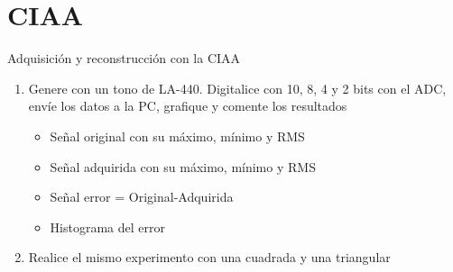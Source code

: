  \section{CIAA}
 \begin{frame}{Adquisición y reconstrucción con la CIAA}
    \begin{enumerate}
       \item{Genere con un tono de LA-440. Digitalice con 10, 8, 4 y 2 bits con el ADC, envíe los datos a la PC, grafique y comente los resultados}
          \begin{itemize}
             \item{Señal original con su máximo, mínimo y RMS }
             \item{Señal adquirida con su máximo, mínimo y RMS }
             \item{Señal error = Original-Adquirida}
             \item{Histograma del error}
          \end{itemize}
       \item{Realice el mismo experimento con una cuadrada y una triangular}
    \end{enumerate}
 \end{frame}
